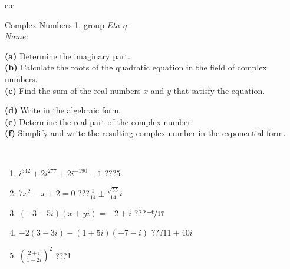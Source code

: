 \documentclass[10pt]{report}
\begin{document}
\begin{tabular}{c:c}
\begin{minipage}[c][104.5mm][t]{0.5\linewidth}
\begin{center}
\vspace{5mm}
{\huge Complex Numbers 1, group \textit{Eta $\eta$} -}\\[5mm]
\textit{Name:}\phantom{xxxxxxxxxxxxxxxxxxxxxxxxxxxxxxxxxxxxxxxxxxxxxxxxxxxxxxxxxxxxxxxxx}\\[5mm]
\begin{minipage}{0.95\linewidth}
\begin{center}
{\small \begin{minipage}{0.44\textwidth} \raggedright
\textbf{(a)} Determine the imaginary part. \\[1mm]
\textbf{(b)} Calculate the roots of the quadratic equation in the field of complex numbers. \\[1mm]
\textbf{(c)} Find the sum of the real numbers \(x\) and \(y\) that satisfy the equation. \end{minipage} \begin{minipage}{0.54\textwidth}
\textbf{(d)} Write in the algebraic form. \\[1mm]
\textbf{(e)} Determine the real part of the complex number. \\[1mm]
\textbf{(f)} Simplify and write the resulting complex number in the exponential form.
\end{minipage}
} \vspace{3mm}
\end{center}
\end{minipage}
\\[1mm]
\begin{minipage}{0.79\linewidth}
\begin{center}
\begin{varwidth}{\linewidth}
\setlength{\itemsep}{0pt}
\begin{enumerate}
\large
\item $i^{342}+2i^{277}+2i^{-190}-1$\quad \dotfill\; ???\;\dotfill \quad $5$
\item $7x^2-x+2=0$\quad \dotfill\; ???\;\dotfill \quad $\frac{1}{14} \pm{}\frac{ \sqrt{55}}{14}i$
\item $(-3-5i)(x+yi)=-2+i$\quad \dotfill\; ???\;\dotfill \quad $\nicefrac{-6}{17}$
\item $-2(3-3i)-(1+5i)\overline{(-7-i)}$\quad \dotfill\; ???\;\dotfill \quad $11+40i$
\item $\left(\frac{2+i}{1-2i}\right)^2$\quad \dotfill\; ???\;\dotfill \quad $1$

\end{enumerate}
\end{varwidth}
\end{center}
\end{minipage}
\end{center}
\end{minipage}
\end{tabular}
\end{document}
